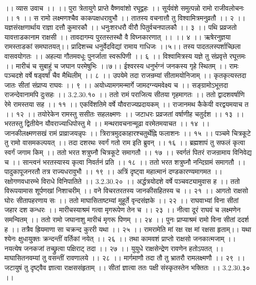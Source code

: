 ।। व्यास उवाच ।। ।।
पुरा त्रेतायुगे प्राप्ते वैष्णवांशो रघूद्वहः ।।
सूर्यवंशे समुत्पन्नो रामो राजीवलोचनः ।। १ ।।
स रामो लक्ष्मणश्चैव काकपक्षधरावुभौ ।।
तातस्य वचनात्तौ तु विश्वामित्रमनुव्रतौ ।। २ ।।
यज्ञसंरक्षणार्थाय राज्ञा दत्तौ कुमारकौ ।।
धनुःशरधरौ वीरौ पितुर्वचनपालकौ ।। ३ ।।
पथि प्रव्रजतो यावत्ताडकानाम राक्षसी ।।
तावदागम्य पुरतस्तस्थौ वै विघ्नकारणात् ।। ।। ४ ।।
ऋषेरनुज्ञया रामस्ताडकां समघातयत्।।
प्रादिशच्च धनुर्वेदविद्यां रामाय गाधिजः ।।५।।
तस्य पादतलस्पर्शाच्छिला वासवयोगतः ।।
अहल्या गौतमवधूः पुनर्जाता स्वरूपिणी ।। ६ ।।
विश्वामित्रस्य यज्ञे तु संप्रवृत्ते रघूत्तमः ।।
मारीचं च सुबाहुं च जघान परमेषुभिः ।।७।।
ईश्वरस्य धनुर्भग्नं जनकस्य गृहे स्थितम् ।।
रामः पञ्चदशे वर्षे षड्वर्षां चैव मैथिलीम् ।। ८ ।।
उपयेमे तदा राजन्रम्यां सीतामयोनिजाम् ।।
कृतकृत्यस्तदा जातः सीतां संप्राप्य राघवः ।। ९ ।।
अयोध्यामगमन्मार्गे जामदग्न्यमवेक्ष्य च ।।
सङ्ग्रामोऽभूत्तदा राजन्देवानामपि दुःसहः ।। 3.2.30.१० ।।
ततो रामं पराजित्य सीतया गृहमागतः ।।
ततो द्वादशवर्षाणि रेमे रामस्तया सह ।। ११ ।।
एकविंशतिमे वर्षे यौवराज्यप्रदायकम् ।।
राजानमथ कैकेयी वरद्वयमयाच त ।। १२ ।।
तयोरेकेन रामस्तु ससीतः सहलक्ष्मणः ।।
जटाधरः प्रव्रजतां वर्षाणीह चतुर्दश ।। १३ ।।
भरतस्तु द्वितीयेन यौवराज्याधिपोस्तु मे ।।
मन्थरावचनान्मूढा वरमेतमयाचत ।। १४ ।।
जानकीलक्ष्मणसखं रामं प्राव्राजयन्नृपः ।।
त्रिरात्रमुदकाहारश्चतुर्थेह्नि फलाशनः ।। १५ ।।
पञ्चमे चित्रकूटे तु रामो वासमकल्पयत् ।।
तदा दशरथः स्वर्गं गतो राम इति ब्रुवन् ।। १६ ।।
ब्रह्मशापं तु सफलं कृत्वा स्वर्गं जगाम किम् ।।
ततो भरत शत्रुघ्नौ चित्रकूटे समागतौ ।। १७ ।।
स्वर्गतं पितरं राजन्रामाय विनिवेद्य च ।।
सान्त्वनं भरतस्यास्य कृत्वा निवर्तनं प्रति ।। १८ ।।
ततो भरत शत्रुघ्नौ नन्दिग्रामं समागतौ ।।
पादुकापूजनरतौ तत्र राज्यधरावुभौ ।। १९ ।।
अत्रिं दृष्ट्वा महात्मानं दण्डकारण्यमागमत ।।
रक्षोगणवधारम्भे विराधे विनिपातिते ।। 3.2.30.२० ।।
अर्द्धत्रयोदशे वर्षे पञ्चवट्यामुवास ह ।।
ततो विरूपयामास शूर्पणखां निशाचरीम् ।।
वने विचरतरतस्य जानकीसहितस्य च ।। २१ ।।
आगतो राक्षसो घोरः सीतापहरणाय सः ।।
ततो माघासिताष्टम्यां मुहूर्ते वृन्दसंज्ञके ।। २२ ।।
राघवाभ्यां विना सीतां जहार दश कन्धरः ।।
मारीचस्याश्रमं गत्वा मृगरूपेण तेन च ।। २३ ।।
नीत्वा दूरं राघवं च लक्ष्मणेन समन्वितम् ।।
ततो रामो जघानाशु मारीचं मृगरू पिणम् ।। २४ ।।
पुनः प्राप्याश्रमं रामो विना सीतां ददर्श ह ।।
तत्रैव ह्रियमाणा सा चक्रन्द कुररी यथा ।। २५ ।।
रामरामेति मां रक्ष रक्ष मां रक्षसा हृताम्।।
यथा श्येनः क्षुधायु्क्तः क्रन्दन्तीं वर्तिकां नयेत् ।। २६ ।।
तथा कामवशं प्राप्तो राक्षसो जनकात्मजाम् ।।
नयत्येष जनकजां तच्छ्रुत्वा पक्षिराट् तदा ।। २७ ।।
युयुधे राक्षसेन्द्रेण रावणेन हतोऽपतत् ।।
माघासितनवम्यां तु वसन्तीं रावणालये ।। २८ ।।
मार्गमाणौ तदा तौ तु भ्रातरौ रामलक्ष्मणौ ।। २९ ।।
जटायुषं तु दृष्ट्वैव ज्ञात्वा राक्षससंहृताम् ।।
सीतां ज्ञात्वा ततः पक्षी संस्कृतस्तेन भक्तितः ।। 3.2.30.३० ।।
